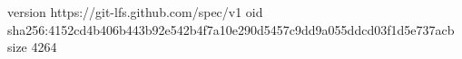 version https://git-lfs.github.com/spec/v1
oid sha256:4152cd4b406b443b92e542b4f7a10e290d5457c9dd9a055ddcd03f1d5e737acb
size 4264
